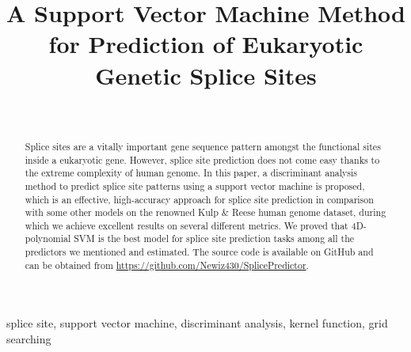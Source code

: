 \documentclass[journal,twoside]{IEEEtran}
\begin{document}
\title{A Support Vector Machine Method for Prediction of Eukaryotic Genetic Splice Sites \\
}

\author{ \\
}

\maketitle

\begin{abstract}
Splice sites are a vitally important gene sequence pattern amongst the functional sites inside a eukaryotic gene. However, splice site prediction does not come easy thanks to the extreme complexity of human genome. In this paper, a discriminant analysis method to predict splice site patterns using a support vector machine is proposed, which is an effective, high-accuracy approach for splice site prediction in comparison with some other models on the renowned Kulp \& Reese human genome dataset, during which we achieve excellent results on several different metrics. We proved that 4D-polynomial SVM is the best model for splice site prediction tasks among all the predictors we mentioned and estimated. The source code is available on GitHub and can be obtained from \url{https://github.com/Newiz430/SplicePredictor}. 
\end{abstract}

\begin{IEEEkeywords}
splice site, support vector machine, discriminant analysis, kernel function, grid searching
\end{IEEEkeywords}
\end{document}
